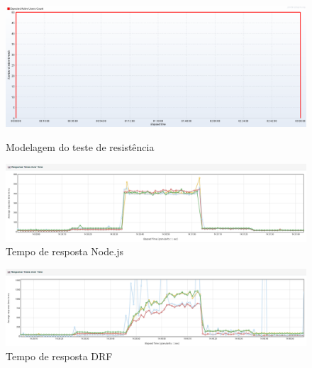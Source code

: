 \documentclass{libs/ufc_format}
\begin{document}
\begin{frame}{}
    \begin{figure}[H]
        \centering
        \caption{Modelagem do teste de resistência}
        \includegraphics[width=1\linewidth]{figuras/model-endurance-v2.pdf}
        \captionsetup{justification=centering}
        \label{fig:model-endurance}
    \end{figure}
\end{frame}


\begin{frame}{}
    \begin{figure}[H]
        \centering
        \caption{Tempo de resposta Node.js}
        \includegraphics[width=1\linewidth]{figuras/tempo-resposta-pico-nodejs.png}
        \captionsetup{justification=centering}
    \end{figure}
\end{frame}

\begin{frame}{}
    \begin{figure}[H]
        \centering
        \caption{Tempo de resposta DRF}
        \includegraphics[width=1\linewidth]{figuras/tempo-resposta-pico-drf.png}
        \captionsetup{justification=centering}
    \end{figure}
\end{frame}
\end{document}
